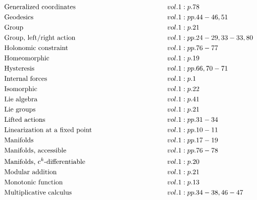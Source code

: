 \documentclass[a4paper]{article}
\begin{document}
\begin{align*}
&\text{Generalized coordinates} \hspace*{10em}&& vol. 1: p. 78\\
&\text{Geodesics} \hspace*{10em}&& vol. 1: pp. 44-46, 51\\
&\text{Group} \hspace*{10em}&& vol. 1: p. 21\\
&\text{Group, left/right action} \hspace*{10em}&& vol. 1: pp. 24-29, 33-33, 80\\
&\text{Holonomic constraint} \hspace*{10em}&& vol. 1: pp. 76-77\\
&\text{Homeomorphic} \hspace*{10em}&& vol. 1: p. 19\\
&\text{Hysteresis} \hspace*{10em}&& vol. 1: pp. 66, 70-71\\
&\text{Internal forces} \hspace*{10em}&& vol. 1: p. 1\\
&\text{Isomorphic} \hspace*{10em}&& vol. 1: p. 22\\
&\text{Lie algebra} \hspace*{10em}&& vol. 1: p. 41\\
&\text{Lie groups} \hspace*{10em}&& vol. 1: p. 21\\
&\text{Lifted actions} \hspace*{10em}&& vol. 1: pp. 31-34\\
&\text{Linearization at a fixed point} \hspace*{10em}&& vol. 1: pp. 10-11\\
&\text{Manifolds} \hspace*{10em}&& vol. 1: pp. 17-19\\
&\text{Manifolds, accessible} \hspace*{10em}&& vol. 1: pp. 76-78\\
&\text{Manifolds, c$^k$-differentiable} \hspace*{10em}&& vol. 1: p. 20\\
&\text{Modular addition} \hspace*{10em}&& vol. 1: p. 21\\
&\text{Monotonic function} \hspace*{10em}&& vol. 1: p. 13\\
&\text{Multiplicative calculus} \hspace*{10em}&& vol. 1: pp. 34-38, 46-47\\

\end{align*}
\end{document}

